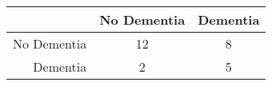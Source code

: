 \begin{table}[ht]
\centering
\begin{tabular}{r|c|c}
  \hline
 & No Dementia & Dementia \\ 
  \hline
No Dementia & 12 & 8 \\ 
  Dementia & 2 & 5 \\ 
   \hline
\end{tabular}
\end{table}

